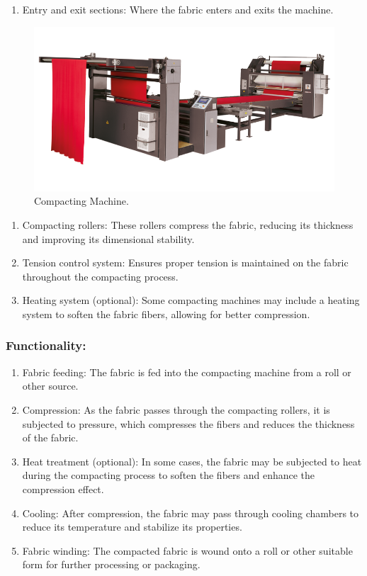 \begin{enumerate}
\item
  Entry and exit sections: Where the fabric enters and exits the
  machine.
\end{enumerate}




\begin{figure}[h!]
  \centering
  \includegraphics[width=0.8\linewidth]{figs/production/image4.png}
  \caption{Compacting Machine.}
  \label{fig:Compacting Machine.}
\end{figure}


\begin{enumerate}
\item
  Compacting rollers: These rollers compress the fabric, reducing its
  thickness and improving its dimensional stability.
\item
  Tension control system: Ensures proper tension is maintained on the
  fabric throughout the compacting process.
\item
  Heating system (optional): Some compacting machines may include a
  heating system to soften the fabric fibers, allowing for better
  compression.
\end{enumerate}

\subsubsection{Functionality:}

\begin{enumerate}
\item
  Fabric feeding: The fabric is fed into the compacting machine from a
  roll or other source.
\item
  Compression: As the fabric passes through the compacting rollers, it
  is subjected to pressure, which compresses the fibers and reduces the
  thickness of the fabric.
\item
  Heat treatment (optional): In some cases, the fabric may be subjected
  to heat during the compacting process to soften the fibers and enhance
  the compression effect.
\item
  Cooling: After compression, the fabric may pass through cooling
  chambers to reduce its temperature and stabilize its properties.
\item
  Fabric winding: The compacted fabric is wound onto a roll or other
  suitable form for further processing or packaging.
\end{enumerate}

